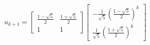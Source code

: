\documentclass[preview]{standalone}
\begin{document}
\begin{center}
$$u_{k + 1} = \begin{bmatrix} \frac{1 - \sqrt{5}}{2} & \frac{1 + \sqrt{5}}{2} \\ 1 & 1 \end{bmatrix} \begin{bmatrix} - \frac{1}{\sqrt{5}} (\frac{1 - \sqrt{5}}{2})^k \\ \frac{1}{\sqrt{5}} (\frac{1 + \sqrt{5}}{2})^k \end{bmatrix}$$
\end{center}
\end{document}
